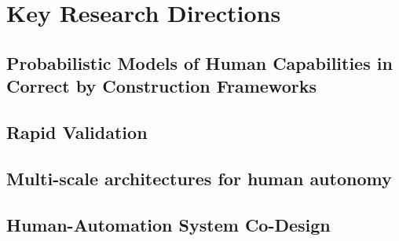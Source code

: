 
\section*{Key Research Directions}

\subsection*{Probabilistic Models of Human Capabilities in Correct by Construction Frameworks}

\subsection*{Rapid Validation}

\subsection*{Multi-scale architectures for human autonomy}

\subsection*{Human-Automation System Co-Design}

